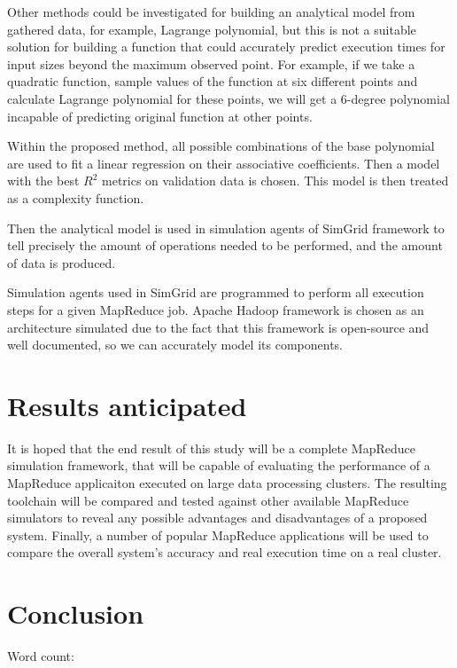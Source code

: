 \documentclass[conference]{IEEEtran} \IEEEoverridecommandlockouts
\begin{document}
    Other methods could be investigated for building an analytical model from
    gathered data, for example, Lagrange polynomial, but this is not a suitable
    solution for building a function that could accurately predict execution
    times for input sizes beyond the maximum observed point. For example, if we
    take a quadratic function, sample values of the function at six different
    points and calculate Lagrange polynomial for these points, we will get a
    6-degree polynomial incapable of predicting original function at other
    points. 

    Within the proposed method, all possible combinations of the base
    polynomial are used to fit a linear regression on their associative
    coefficients. Then a model with the best $R^2$ metrics on validation data
    is chosen. This model is then treated as a complexity function.

    Then the analytical model is used in simulation agents of SimGrid\cite{simgrid} framework
    to tell precisely the amount of operations needed to be performed, and the
    amount of data is produced.

    Simulation agents used in SimGrid are programmed to perform all execution
    steps for a given MapReduce job. Apache Hadoop framework is chosen as an
    architecture simulated due to the fact that this framework is open-source
    and well documented, so we can accurately model its components. 


    \section{Results anticipated}

    It is hoped that the end result of this study will be a complete MapReduce
    simulation framework, that will be capable of evaluating the performance of
    a MapReduce applicaiton executed on large data processing clusters. The
    resulting toolchain will be compared and tested against other available
    MapReduce simulators to reveal any possible advantages and disadvantages of
    a proposed system. Finally, a number of popular MapReduce applications will
    be used to compare the overall system's accuracy and real execution time on
    a real cluster. 

    \section{Conclusion}

    
    \printbibliography

    \vspace{10 mm}

    \begin{flushright}
        Word count: 
    \end{flushright}
\end{document}
